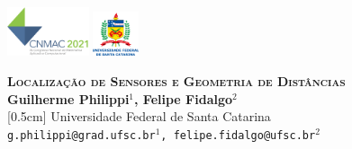 \documentclass[a0,portrait]{a0poster}
\theoremstyle{plain}
\theoremstyle{definition}
\begin{document}
\onehalfspacing


\begin{center}
\vspace*{-3.8cm}
    \includegraphics[width=0.18\textwidth]{logo} 
	\hspace{55.5cm}
	\includegraphics[width=0.1\textwidth]{vertical_extenso_fundo_claro_ok.png} 
\vspace{1,5cm}
\end{center}

\vspace{-10.5cm}
\begin{minipage}[b]{1.0\linewidth} %
\begin{center}
\Huge \textbf{\textsc{Localização de Sensores e Geometria de Distâncias}}\\
\vspace{0.3cm}\huge \textbf{Guilherme Philippi$^{1}$, Felipe Fidalgo$^{2}$}\\
[0.5cm] %
\huge Universidade Federal de Santa Catarina\\[0.4cm] %
\Large \texttt{g.philippi@grad.ufsc.br$^{1}$, felipe.fidalgo@ufsc.br$^{2}$}\\
\end{center}
\end{minipage}
%
\vspace{1cm} %
\end{document}

